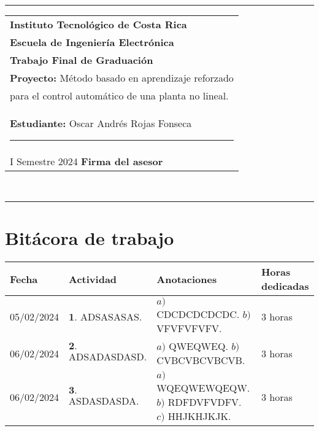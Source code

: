 \documentclass[12pt]{article}
\begin{document}
\hfill\\
\rule{\textwidth}{1.5pt}

\begin{minipage}[t]{85mm}
  \begin{tabular}{l}
    \textbf{\large Instituto Tecnológico de Costa Rica} \\  
    \textbf{Escuela de Ingeniería Electrónica} \\
    \textbf{Trabajo Final de Graduación} \\
    \textbf{Proyecto:} Método basado en aprendizaje reforzado \\para el control automático de una planta no lineal. \\
    \textbf{Estudiante:} Oscar Andrés Rojas Fonseca \hspace{3cm}\rule{4.5cm}{1.5pt}\\
    I Semestre 2024 \hspace{8.5cm}\textbf{Firma del asesor}
  \end{tabular}
\end{minipage}
\hfill\\
\rule{\textwidth}{1.5pt}


\section*{Bitácora de trabajo}

\begin{minipage}[h]{\textwidth}
	\centering
	\begin{tabularx}{\textwidth}{|p{2cm}|X|X|p{2cm}|} 
		\hline
		\rowcolor{encabezado}
		\textbf{Fecha} & 
		\textbf{Actividad} & 
		\textbf{Anotaciones} & 
		\textbf{Horas dedicadas} \\ \hline
		05/02/2024 & 
		$\mathbf{1}.$ ADSASASAS. & 
		$a)$ CDCDCDCDCDC. \newline $b)$ VFVFVFVFV. \newline & 
		3 horas \\
	 	06/02/2024 & 
	 	$\mathbf{2}.$ ADSADASDASD. &
	 	$a)$ QWEQWEQ. \newline $b)$ CVBCVBCVBCVB. \newline & 
	 	3 horas \\
	 	06/02/2024 & 
	 	$\mathbf{3}.$ ASDASDASDA. & 
	 	$a)$ WQEQWEWQEQW. \newline $b)$ RDFDVFVDFV. \newline $c)$ HHJKHJKJK. & 
	 	3 horas \\
	 	
	 	\hline
	\end{tabularx}
\end{minipage}	 	
	 	
\end{document}
